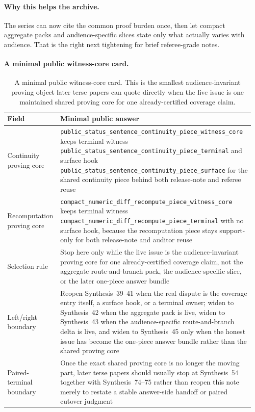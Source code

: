 \documentclass[11pt]{article}
\begin{document}
\paragraph{Why this helps the archive.}
The series can now cite the common proof burden once, then let compact aggregate packs and audience-specific slices state only what actually varies with audience.
That is the right next tightening for brief referee-grade notes.


\paragraph{A minimal public witness-core card.}
\begin{table}[t]
\centering
\small
\begin{tabularx}{\linewidth}{@{}lX@{}}
\toprule
Field & Minimal public answer \\
\midrule
Continuity proving core & \nolinkurl{public_status_sentence_continuity_piece_witness_core} keeps terminal witness \nolinkurl{public_status_sentence_continuity_piece_terminal} and surface hook \nolinkurl{public_status_sentence_continuity_piece_surface} for the shared continuity piece behind both release-note and referee reuse \\
Recomputation proving core & \nolinkurl{compact_numeric_diff_recompute_piece_witness_core} keeps terminal witness \nolinkurl{compact_numeric_diff_recompute_piece_terminal} with no surface hook, because the recomputation piece stays support-only for both release-note and auditor reuse \\
Selection rule & Stop here only while the live issue is the audience-invariant proving core for one already-certified coverage claim, not the aggregate route-and-branch pack, the audience-specific slice, or the later one-piece answer bundle \\
Left/right boundary & Reopen Synthesis~39--41 when the real dispute is the coverage entry itself, a surface hook, or a terminal owner; widen to Synthesis~42 when the aggregate pack is live, widen to Synthesis~43 when the audience-specific route-and-branch delta is live, and widen to Synthesis~45 only when the honest issue has become the one-piece answer bundle rather than the shared proving core \\
Paired-terminal boundary & Once the exact shared proving core is no longer the moving part, later terse papers should usually stop at Synthesis~54 together with Synthesis~74--75 rather than reopen this note merely to restate a stable answer-side handoff or paired cutover judgment \\
\bottomrule
\end{tabularx}
\caption{A minimal public witness-core card. This is the smallest audience-invariant proving object later terse papers can quote directly when the live issue is one maintained shared proving core for one already-certified coverage claim.}
\label{tab:minimal-public-witness-core-card}
\end{table}
\end{document}
